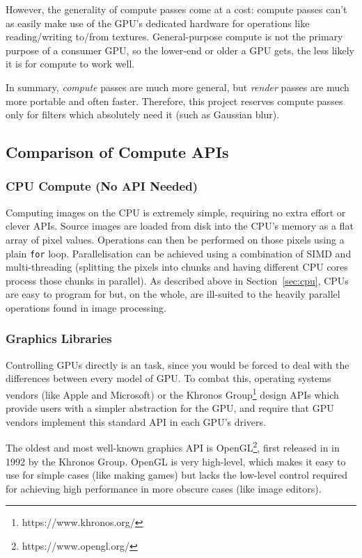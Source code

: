\documentclass[12pt]{article}
\begin{document}
However, the generality of compute passes come at a cost: compute passes can't as easily make use of
the GPU's dedicated hardware for operations like reading/writing to/from textures.  General-purpose
compute is not the primary purpose of a consumer GPU, so the lower-end or older a GPU gets, the less
likely it is for compute to work well.

In summary, \emph{compute} passes are much more general, but \emph{render} passes are much more
portable and often faster.  Therefore, this project reserves compute passes only for filters which
absolutely need it (such as Gaussian blur).

\subsection{Comparison of Compute APIs}

\subsubsection{CPU Compute (No API Needed)}

Computing images on the CPU is extremely simple, requiring no extra effort or clever APIs.  Source
images are loaded from disk into the CPU's memory as a flat array of pixel values.  Operations can
then be performed on those pixels using a plain \verb|for| loop.  Parallelisation can be achieved
using a combination of SIMD and multi-threading (splitting the pixels into chunks and having
different CPU cores process those chunks in parallel).  As described above in Section~\ref{sec:cpu},
CPUs are easy to program for but, on the whole, are ill-suited to the heavily parallel operations
found in image processing.

\subsubsection{Graphics Libraries}

Controlling GPUs directly is an task, since you would be forced to deal with the differences between
every model of GPU.  To combat this, operating systems vendors (like Apple and Microsoft) or the
Khronos Group\footnote{https://www.khronos.org/} design APIs which provide users with a simpler
abstraction for the GPU, and require that GPU vendors implement this standard API in each GPU's
drivers.

The oldest and most well-known graphics API is OpenGL\footnote{https://www.opengl.org/}, first
released in in 1992 by the Khronos Group.  OpenGL is very high-level, which makes it easy to use for
simple cases (like making games) but lacks the low-level control required for achieving high
performance in more obscure cases (like image editors).
\end{document}
